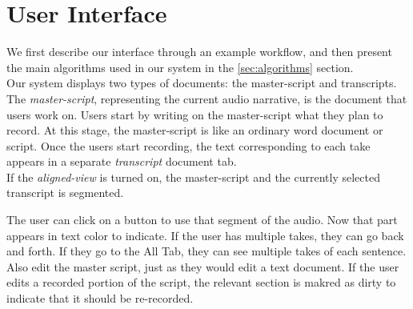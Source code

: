 \section{User Interface}
We first describe our interface through an example workflow, and then present the main algorithms used in our system in the \ref{sec:algorithms} section.\\
 Our system displays two types of documents: the master-script and transcripts. The \textit{master-script}, representing the current audio narrative, is the document that users work on. Users start by writing on the master-script what they plan to
record. At this stage, the master-script is like an ordinary
word document or script. Once the users start recording, the text corresponding to each take appears in a separate \textit{transcript} document tab.\\
If the \textit{aligned-view} is turned on, the master-script and the currently selected transcript is segmented.

The user can click on a button to use that segment of the audio. Now that part appears in text color to indicate. If the user has multiple takes, they can go back and forth. If they go to the All Tab, they can see multiple takes of each sentence.
Also edit the master script, just as they would edit a text document. If the user edits a recorded portion of the script, the relevant section is makred as dirty to indicate that it should be re-recorded.

